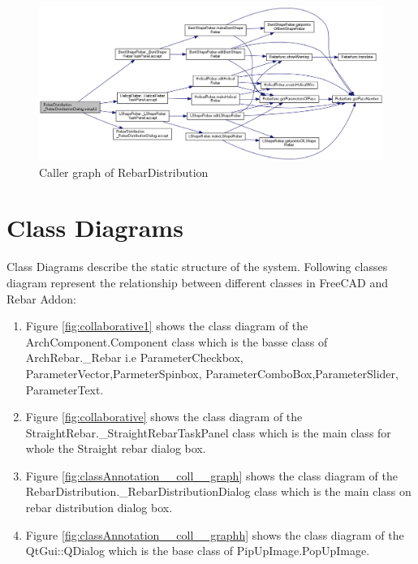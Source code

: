 \begin{figure}
\centering
\includegraphics[width=1\linewidth,height=1\columnwidth]{images/rebardistribution.png}
\caption{Caller graph of RebarDistribution}
\label{fig:dependencyy}
\end{figure}


\section{Class Diagrams}
Class Diagrams describe the static structure of the system. Following classes diagram represent the relationship between different classes in FreeCAD and Rebar Addon:
\begin{enumerate}
	\item Figure \ref{fig:collaborative1} shows the class diagram of the ArchComponent.Component class which is the basse class of ArchRebar.\_Rebar i.e ParameterCheckbox, ParameterVector,ParmeterSpinbox, ParameterComboBox,ParameterSlider, ParameterText.

	\item Figure \ref{fig:collaborative} shows the class diagram of the StraightRebar.\_StraightRebarTaskPanel class which is the main class for whole the Straight rebar dialog box.
	
	\item Figure \ref{fig:classAnnotation__coll__graph}  shows the class diagram of the RebarDistribution.\_RebarDistributionDialog class which is the main class on rebar distribution dialog box.

	\item Figure \ref{fig:classAnnotation__coll__graphh}  shows the class diagram of the QtGui::QDialog which is the base class of PipUpImage.PopUpImage.
\end{enumerate}

